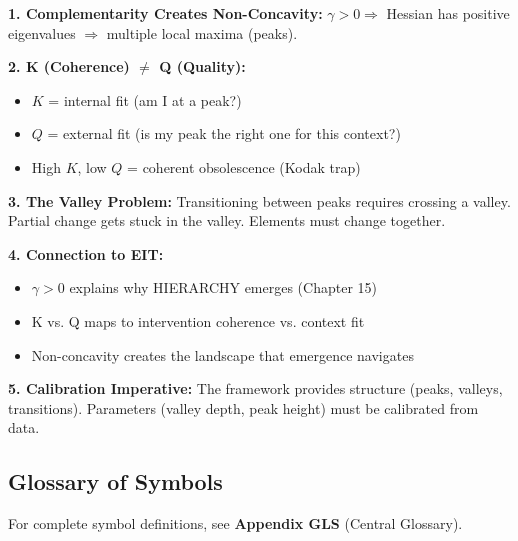 \begin{tcolorbox}[colback=gray!10!white, colframe=gray!75!black,
    title=\textbf{Summary: Non-Concavity and Fit}]

\textbf{1. Complementarity Creates Non-Concavity:}
$\gamma > 0 \Rightarrow$ Hessian has positive eigenvalues $\Rightarrow$ multiple local maxima (peaks).

\textbf{2. K (Coherence) $\neq$ Q (Quality):}
\begin{itemize}[nosep]
\item $K$ = internal fit (am I at a peak?)
\item $Q$ = external fit (is my peak the right one for this context?)
\item High $K$, low $Q$ = coherent obsolescence (Kodak trap)
\end{itemize}

\textbf{3. The Valley Problem:}
Transitioning between peaks requires crossing a valley. Partial change gets stuck in the valley. Elements must change together.

\textbf{4. Connection to EIT:}
\begin{itemize}[nosep]
\item $\gamma > 0$ explains why HIERARCHY emerges (Chapter 15)
\item K vs. Q maps to intervention coherence vs. context fit
\item Non-concavity creates the landscape that emergence navigates
\end{itemize}

\textbf{5. Calibration Imperative:}
The framework provides structure (peaks, valleys, transitions). Parameters (valley depth, peak height) must be calibrated from data.

\end{tcolorbox}


\subsection{Glossary of Symbols}

For complete symbol definitions, see \textbf{Appendix GLS} (Central Glossary).

